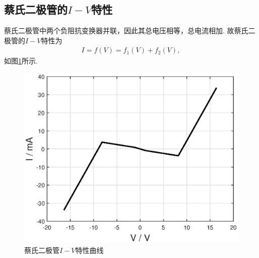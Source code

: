 \documentclass{assignment}
\begin{document}
\subsection{蔡氏二极管的$I-V$特性}
蔡氏二极管中两个负阻抗变换器并联，因此其总电压相等，总电流相加. 故蔡氏二极管的$I-V$特性为
\begin{align}
    I=f(V)=f_1(V)+f_2(V),
\end{align}
如图\ref{Chua's-diode-I-V}所示.

\begin{figure}[h]
    \centering
    \includegraphics[width=.5\columnwidth]{ChuasDiode-I-V.eps}
    \caption{蔡氏二极管$I-V$特性曲线}
    \label{Chua's-diode-I-V}
\end{figure}
\end{document}
